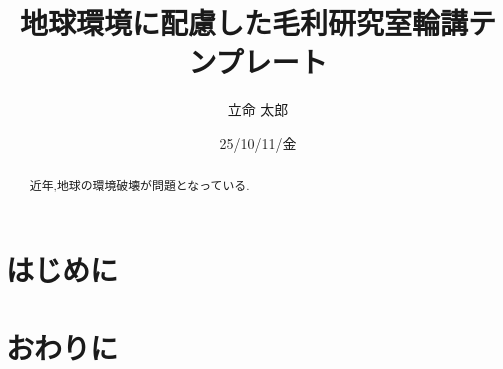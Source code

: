 \documentclass[submit,techreq,noauthor]{eco}	%
\begin{document}
\date   {25/10/11/金}				%
\title  {地球環境に配慮した毛利研究室輪講テンプレート}	%
\author {立命 太郎}				%


\begin{abstract}
近年,地球の環境破壊が問題となっている.
\end{abstract}
\maketitle

\section{はじめに}


\section{おわりに}
\end{document}
